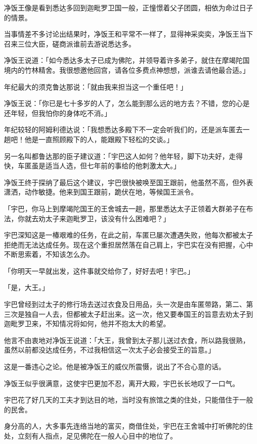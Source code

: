 \documentclass[12pt,twoside,openany]{book}
\begin{document}
净饭王像是看到悉达多回到迦毗罗卫国一般，正憧憬着父子团圆，相依为命过日子的情景。

当事情差不多讨论出结果时，净饭王和平常不一样了，显得神采奕奕，净饭王当下召来三位大臣，磋商派谁前去游说悉达多。

净饭王说道：「如今悉达多太子已成为佛陀，并领导着许多弟子，就住在摩竭陀国境内的竹林精舍。我很想邀他回宫，请各位多费点神想想，派谁去请他最合适。」

年纪最大的须克鲁达那说：「就由我来担当这一个重任吧！」

净饭王说：「你已是七十多岁的人了，怎么能到那么远的地方去？不错，您的心是还年轻，但我怕你的身体吃不消。」

年纪较轻的阿姆利德达说：「我想悉达多殿下不一定会听我们的，还是派车匿去一趟吧！他是一直照顾殿下的人，能跟殿下轻松的交谈。」

另一名叫都鲁达那的臣子建议道：「宇巴这人如何？他年轻，脚下功夫好，走得快，车匿虽是适当人选，但七年前的事给的他刺激太大。」

净饭王终于探纳了最后这个建议，宇巴很快被唤至国王跟前，他虽然不高，但外表潇洒，动作敏捷。他来到国王跟前，跪伏在地，等候国王派令。

「宇巴，你马上到摩竭陀国王的王舍城去一趟，那里悉达太子正领着大群弟子在布法，你就去劝太子来迦毗罗卫，该没有什么困难吧？」

宇巴深知这是一椿艰难的任务，在此之前，车匿已屡次遭遇失败，他每次都被太子拒绝而无法达成任务。现在这个重担居然落在自己肩上，宇巴实在没有把握，心中不断思索着，不知该怎么办。

「你明天一早就出发，这件事就交给你了，好好去吧！宇巴。」

「是，大王。」

宇巴曾经到过太子的修行场去送过衣食及日用品，头一次是由车匿带路，第二、第三次是独自一人去，但都被太子赶出来。这一次，他又要奉国王的旨意去劝太子到迦毗罗卫来，不知情况将如何，他并不抱太大的希望。

他言不由衷地对净饭王说道：「大王，我曾到太子那儿送过衣食，所以路我很熟，虽然以前都没达成任务，不过我相信这一次太子必会接受王的旨意。」

这是一番违心之论。他是被净饭王的威仪所震慑，说出了不合心意的话。

净饭王似乎很满意，这使宇巴更加不忍，离开大殿，宇巴长长地叹了一口气。

宇巴花了好几天的工夫才到达目的地，当时没有旅馆之类的住处，只能借住于一般的民舍。

身分高的人，大多事先连络当地的富买，商借住处，宇巴在王舍城中打听佛陀的住处，立刻有人指点，足见佛陀在一般人心目中的地位了。
\end{document}
